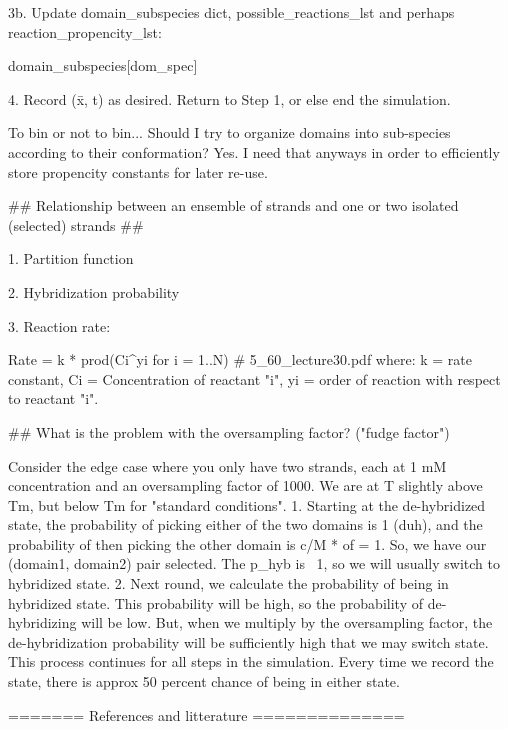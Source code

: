     3b. Update domain_subspecies dict, possible_reactions_lst and perhaps reaction_propencity_lst:

        domain_subspecies[dom_spec]


    4. Record (x̄, t) as desired. Return to Step 1, or else end the simulation.



    To bin or not to bin...
    Should I try to organize domains into sub-species according to their conformation?
    Yes. I need that anyways in order to efficiently store propencity constants for later re-use.


## Relationship between an ensemble of strands and one or two isolated (selected) strands ##


    1. Partition function


    2. Hybridization probability


    3. Reaction rate:

        Rate = k * prod(Ci^yi for i = 1..N)            # 5_60_lecture30.pdf
        where:  k  = rate constant, Ci = Concentration of reactant "i",
                yi = order of reaction with respect to reactant "i".





## What is the problem with the oversampling factor?  ("fudge factor")

    Consider the edge case where you only have two strands, each at 1 mM concentration
    and an oversampling factor of 1000.
    We are at T slightly above Tm, but below Tm for "standard conditions".
    1. Starting at the de-hybridized state,
    the probability of picking either of the two domains is 1 (duh),
    and the probability of then picking the other domain is c/M * of = 1.
    So, we have our (domain1, domain2) pair selected.
    The p_hyb is ~1, so we will usually switch to hybridized state.
    2. Next round, we calculate the probability of being in hybridized state.
    This probability will be high, so the probability of de-hybridizing will be low.
    But, when we multiply by the oversampling factor, the de-hybridization probability will
    be sufficiently high that we may switch state.
    This process continues for all steps in the simulation. Every time we record the state,
    there is approx 50 percent chance of being in either state.





======= References and litterature ==============



